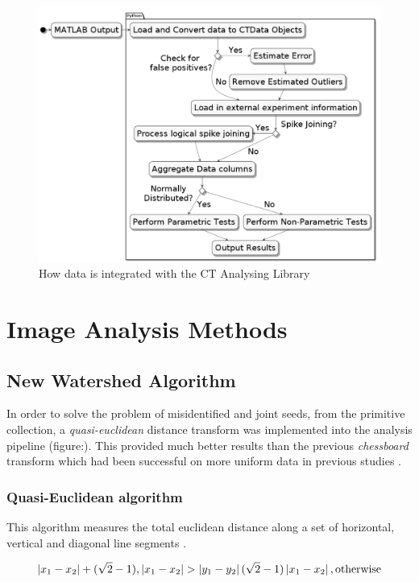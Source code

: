 \documentclass[11pt]{report}
\begin{document}
\begin{figure}[htbp]
\centering
\includegraphics[width=13cm]{./images/pipeline.png}
\caption{\label{fig:org2bed50a}
How data is integrated with the CT Analysing Library}
\end{figure}


\section{Image Analysis Methods}
\label{sec:orga76d956}
\subsection{New Watershed Algorithm}
\label{sec:orga7fed65}

In order to solve the problem of misidentified and joint seeds, from the primitive collection,
a  \emph{quasi-euclidean} distance transform was implemented into the analysis pipeline (figure:). This provided much better results than the previous
\emph{chessboard} transform which had been successful on more uniform data in previous studies \cite{Hughes2017}.

\subsubsection{Quasi-Euclidean algorithm}
\label{sec:org484200b}

This algorithm measures the total euclidean distance along a set of horizontal, vertical and diagonal
line segments \cite{Pfaltz1966}.

\begin{equation}
\label{eq:orge49a617}
\left | x_1 - x_2 \right | + (\sqrt{2}-1), \left | x_1 - x_2 \right | >\left | y_1 - y_2 \right | (\sqrt{2}-1) \left | x_1 - x_2 \right | ,\textup{otherwise}
\end{equation}
\end{document}
